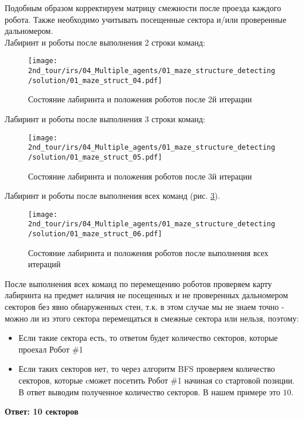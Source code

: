 Подобным образом корректируем матрицу смежности после проезда каждого робота. Также необходимо учитывать посещенные сектора и/или проверенные дальномером.\\

Лабиринт и роботы после выполнения 2 строки команд:
\begin{figure}[H]
	\centering
	\texttt{[image: 2nd\_tour/irs/04\_Multiple\_agents/01\_maze\_structure\_detecting/solution/01\_maze\_struct\_04.pdf]}
	\caption{Состояние лабиринта и положения роботов после 2й итерации}
	\label{fig:01_maze_struct_04}
\end{figure}

Лабиринт и роботы после выполнения 3 строки команд:
\begin{figure}[H]
	\centering
	\texttt{[image: 2nd\_tour/irs/04\_Multiple\_agents/01\_maze\_structure\_detecting/solution/01\_maze\_struct\_05.pdf]}
	\caption{Состояние лабиринта и положения роботов после 3й итерации}
	\label{fig:01_maze_struct_05}
\end{figure}

Лабиринт и роботы после выполнения всех команд (рис. \ref{fig:01_maze_struct_06}).
\begin{figure}[H]
	\centering
	\texttt{[image: 2nd\_tour/irs/04\_Multiple\_agents/01\_maze\_structure\_detecting/solution/01\_maze\_struct\_06.pdf]}
	\caption{Состояние лабиринта и положения роботов после выполнения всех итераций}
	\label{fig:01_maze_struct_06}
\end{figure}

После выполнения всех команд по перемещению роботов проверяем карту лабиринта на предмет наличия не посещенных и не проверенных дальномером секторов без явно обнаруженных стен, т.к. в этом случае мы не знаем точно - можно ли из этого сектора перемещаться в смежные сектора или нельзя, поэтому:
\begin{itemize}
	\item  Если такие сектора есть, то ответом будет количество секторов, которые проехал Робот \#1
	\item Если таких секторов нет, то через алгоритм BFS проверяем количество секторов, которые cможет посетить Робот \#1 начиная со стартовой позиции. \\
	В ответ выводим полученное количество секторов. В нашем примере это $10$.
\end{itemize}


\textbf{Ответ: 10 секторов}


\codeExample

